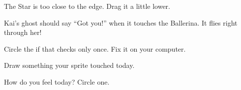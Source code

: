 \begin{grownup}
The Star is too close to the edge. Drag it a little lower.
\end{grownup}

\begin{exercise}
Kai's ghost should say \enquote{Got you!} when it touches the Ballerina. It flies right through her!
\begin{center}
\begin{scratch}[scale=0.75]
\end{scratch}
\end{center}
Circle the if that checks only once. Fix it on your computer.
\end{exercise}

\begin{vocab}
\end{vocab}

\begin{reflection}
Draw something your sprite touched today.
\answerspace{3cm}

How do you feel today? Circle one.

\begin{center}
\Huge\faSmile[regular]\qquad\faMeh[regular]\qquad\faFrown[regular]
\end{center}
\end{reflection}
